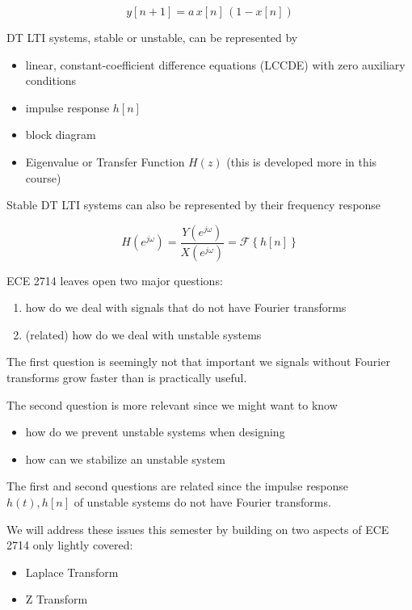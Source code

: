 \documentclass{article}
\begin{document}
\begin{equation}
  y[n+1] = a\, x[n]\, (1-x[n])
\end{equation}

DT LTI systems, stable or unstable, can be represented by

\begin{itemize}
\item linear, constant-coefficient difference equations (LCCDE) with zero auxiliary conditions
\item impulse response $h[n]$
\item block diagram
\item Eigenvalue or Transfer Function $H(z)$ (this is developed more in this course)
\end{itemize}

Stable DT LTI systems can also be represented by their frequency response

\begin{equation}
  H\left(e^{j\omega}\right) = \frac{Y\left(e^{j\omega}\right)}{X\left(e^{j\omega}\right)} = \mathcal{F}\left\{ h[n] \right\}
\end{equation}

ECE 2714 leaves open two major questions:

\begin{enumerate}
\item how do we deal with signals that do not have Fourier transforms
\item (related) how do we deal with unstable systems
\end{enumerate}

The first question is seemingly not that important we signals without Fourier transforms grow faster than is practically useful.

The second question is more relevant since we might want to know

\begin{itemize}
\item how do we prevent unstable systems when designing
\item how can we stabilize an unstable system
\end{itemize}

The first and second questions are related since the impulse response $h(t), h[n]$ of unstable systems do not have Fourier transforms.

We will address these issues this semester by building on two aspects of ECE 2714 only lightly covered:

\begin{itemize}
\item Laplace Transform
\item Z Transform
\end{itemize}
\end{document}
